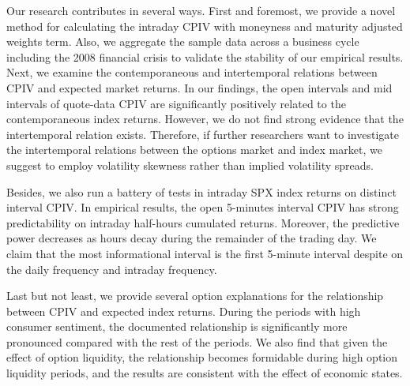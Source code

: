 Our research contributes in several ways. First and foremost, we provide a novel method for calculating the intraday CPIV with moneyness and maturity adjusted weights term. Also, we aggregate the sample data across a business cycle including the 2008 financial crisis to validate the stability of our empirical results. Next, we examine the contemporaneous and intertemporal relations between CPIV and expected market returns. In our findings, the open intervals and mid intervals of quote-data CPIV are significantly positively related to the contemporaneous index returns. However, we do not find strong evidence that the intertemporal relation exists. Therefore, if further researchers want to investigate the intertemporal relations between the options market and index market, we suggest to employ volatility skewness rather than implied volatility spreads.   

Besides, we also run a battery of tests in intraday SPX index returns on distinct interval CPIV. In empirical results, the open 5-minutes interval CPIV has strong predictability on intraday half-hours cumulated returns. Moreover, the predictive power decreases as hours decay during the remainder of the trading day. We claim that the most informational interval is the first 5-minute interval despite on the daily frequency and intraday frequency. 

Last but not least, we provide several option explanations for the relationship between CPIV and expected index returns. During the periods with high consumer sentiment, the documented relationship is significantly more pronounced compared with the rest of the periods. We also find that given the effect of option liquidity, the relationship becomes formidable during high option liquidity periods, and the results are consistent with the effect of economic states.  